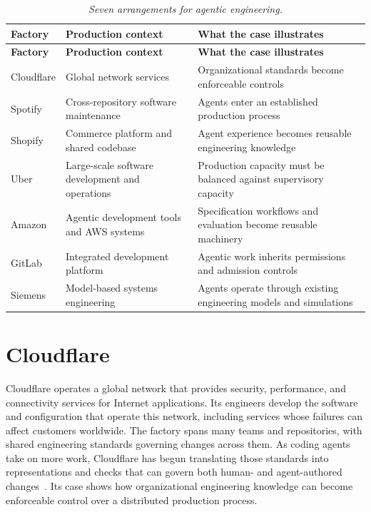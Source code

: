 {\footnotesize
\begin{longtable}[]{@{}
  >{\raggedright\arraybackslash}p{}
  >{\raggedright\arraybackslash}p{}
  >{\raggedright\arraybackslash}p{}@{}}
\caption[Seven arrangements for agentic engineering]{\emph{Seven arrangements for agentic engineering.}}\label{agentic-engineering-factories}\tabularnewline
\toprule\noalign{}
\textbf{Factory} & \textbf{Production context} & \textbf{What the case illustrates} \\
\midrule\noalign{}
\endfirsthead
\toprule\noalign{}
\textbf{Factory} & \textbf{Production context} & \textbf{What the case illustrates} \\
\midrule\noalign{}
\endhead
\bottomrule\noalign{}
\endlastfoot
Cloudflare & Global network services & Organizational standards become enforceable controls \\
Spotify & Cross-repository software maintenance & Agents enter an established production process \\
Shopify & Commerce platform and shared codebase & Agent experience becomes reusable engineering knowledge \\
Uber & Large-scale software development and operations & Production capacity must be balanced against supervisory capacity \\
Amazon & Agentic development tools and AWS systems & Specification workflows and evaluation become reusable machinery \\
GitLab & Integrated development platform & Agentic work inherits permissions and admission controls \\
Siemens & Model-based systems engineering & Agents operate through existing engineering models and simulations \\
\end{longtable}
}

\section{Cloudflare}\label{heading:cloudflare}

Cloudflare operates a global network that provides security, performance, and connectivity services for Internet applications. Its engineers develop the software and configuration that operate this network, including services whose failures can affect customers worldwide. The factory spans many teams and repositories, with shared engineering standards governing changes across them. As coding agents take on more work, Cloudflare has begun translating those standards into representations and checks that can govern both human- and agent-authored changes~\citep{reimann2026codex}. Its case shows how organizational engineering knowledge can become enforceable control over a distributed production process.

